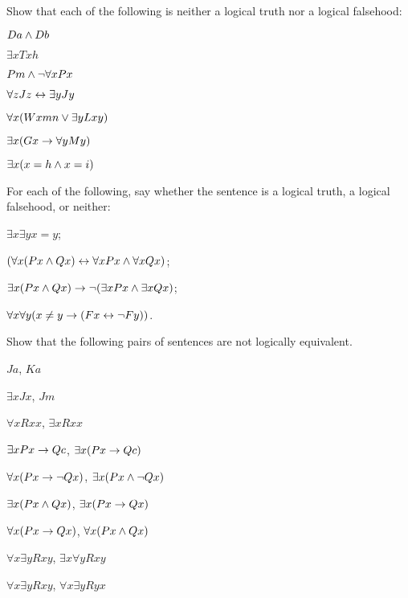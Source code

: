 
\practiceproblems



\problempart
\label{pr.Contingent}
Show that each of the following is neither a logical truth nor a logical falsehood:
\begin{earg}
\item  $Da \wedge Db$
\item  $\exists x Txh$
\item  $Pm \wedge \neg\forall x Px$
\item $\forall z Jz \leftrightarrow \exists y Jy$
\item $\forall x (Wxmn \vee \exists yLxy)$
\item $\exists x (Gx \rightarrow \forall y My)$
\item $\exists x (x = h \wedge x = i)$
\end{earg}

\problempart For each of the following, say whether the sentence is a logical truth, a logical falsehood, or neither: \begin{earg}
	\item $\exists x \exists y x=y$;
	\item $(\forall x (Px\wedge Qx)\leftrightarrow \forall x Px\wedge \forall x Qx)$;
	\item $\exists x (Px\wedge Qx) \rightarrow \neg (\exists x Px\wedge \exists x Qx)$;
	\item $\forall x \forall y (x \neq y \rightarrow (Fx \leftrightarrow \neg Fy))$.
\end{earg}


\problempart
\label{pr.NotEquiv}
Show that the following pairs of sentences are not logically equivalent.
\begin{earg}
\item $Ja$, $Ka$
\item $\exists x Jx$, $Jm$
\item $\forall x Rxx$, $\exists x Rxx$
\item $\exists x Px \rightarrow Qc$, $\exists x (Px \rightarrow Qc)$
\item $\forall x(Px \rightarrow \neg Qx)$, $\exists x(Px \wedge \neg Qx)$
\item $\exists x(Px \wedge Qx)$, $\exists x(Px \rightarrow Qx)$
\item $\forall x(Px\rightarrow Qx)$, $\forall x(Px \wedge Qx)$
\item $\forall x\exists y Rxy$, $\exists x\forall y Rxy$
\item $\forall x\exists y Rxy$, $\forall x\exists y Ryx$
\end{earg}



